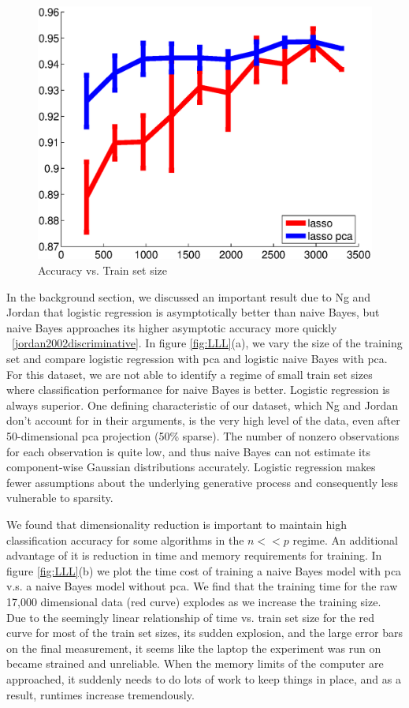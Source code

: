 \begin{center}
\begin{figure}[!ht]
\centering
\includegraphics[width=.5\textwidth]{../images/_lasso_lasso_pca_acc.eps}
\caption{Accuracy vs. Train set size}
\par
\label{fig:lassoCompare}
\end{figure}
\end{center}

	In the background section, we discussed an important result due to Ng and Jordan that logistic regression is asymptotically better than naive Bayes, but naive Bayes approaches its higher asymptotic accuracy more quickly ~\ref{jordan2002discriminative}. In figure \ref{fig:LLL}(a), we vary the size of the training set and compare logistic regression with pca and logistic naive Bayes with pca. For this dataset, we are not able to identify a regime of small train set sizes where classification performance for naive Bayes is better. Logistic regression is always superior. One defining characteristic of our dataset, which Ng and Jordan don't account for in their arguments, is the very high level of the data, even after 50-dimensional pca projection (50\% sparse). The number of nonzero observations for each observation is quite low, and thus naive Bayes can not estimate its component-wise Gaussian distributions accurately. Logistic regression makes fewer assumptions about the underlying generative process and consequently less vulnerable to sparsity. 

	We found that dimensionality reduction is important to maintain high classification accuracy for some algorithms in the $n << p$ regime. An additional advantage of it is reduction in time and memory requirements for training. In figure \ref{fig:LLL}(b) we plot the time cost of training a naive Bayes model with pca v.s. a naive Bayes model without pca. We find that the training time for the raw 17,000 dimensional data (red curve) explodes as we increase the training size. Due to the seemingly linear relationship of time vs. train set size for the red curve for most of the train set sizes, its sudden explosion, and the large error bars on the final measurement, it seems like the laptop the experiment was run on became strained and unreliable. When the memory limits of the computer are approached, it suddenly needs to do lots of work to keep things in place, and as a result, runtimes increase tremendously. 


